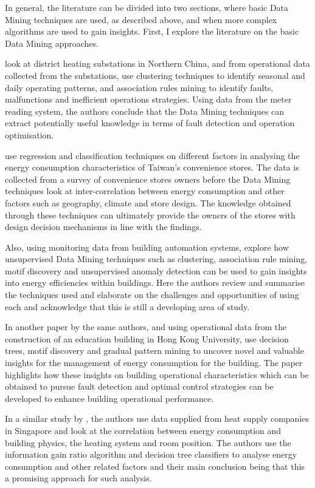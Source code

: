 \documentclass[12pt]{scrartcl}
\begin{document}
In general, the literature can be divided into two sections, where basic Data Mining techniques are used, as described above, and when more complex algorithms are used to gain insights. First, I explore the literature on the basic Data Mining approaches.
 
\citet{XUE2017926} look at district heating substations in Northern China, and from operational data collected from the substations, use clustering techniques to identify seasonal and daily operating patterns, and association rules mining to identify faults, malfunctions and inefficient operations strategies. Using data from the meter reading system, the authors conclude that the Data Mining techniques can extract potentially useful knowledge in terms of fault detection and operation optimisation. 

\citet{JEFFREYKUO2018120} use regression and classification techniques on different factors in analysing the energy consumption characteristics of Taiwan's convenience stores. The data is collected from a survey of convenience stores owners before the Data Mining techniques look at inter-correlation between energy consumption and other factors such as geography, climate and store design. The knowledge obtained through these techniques can ultimately provide the owners of the stores with design decision mechanisms in line with the findings.  

Also, using monitoring data from building automation systems, \citet{FAN2018296} explore how unsupervised Data Mining techniques such as clustering, association rule mining, motif discovery and unsupervised anomaly detection can be used to gain insights into energy efficiencies within buildings. Here the authors review and summarise the techniques used and elaborate on the challenges and opportunities of using each and acknowledge that this is still a developing area of study.  

In another paper by the same authors, and using operational data from the construction of an education building in Hong Kong University, \citet{FAN2018296} use decision trees, motif discovery and gradual pattern mining to uncover novel and valuable insights for the management of energy consumption for the building. The paper highlights how these insights on building operational characteristics which can be obtained to pursue fault detection and optimal control strategies can be developed to enhance building operational performance.   

In a similar study by \citet{ZHOU201873}, the authors use data supplied from heat supply companies in Singapore and look at the correlation between energy consumption and building physics, the heating system and room position. The authors use the information gain ratio algorithm and decision tree classifiers to analyse energy consumption and other related factors and their main conclusion being that this a promising approach for such analysis. 
\end{document}
